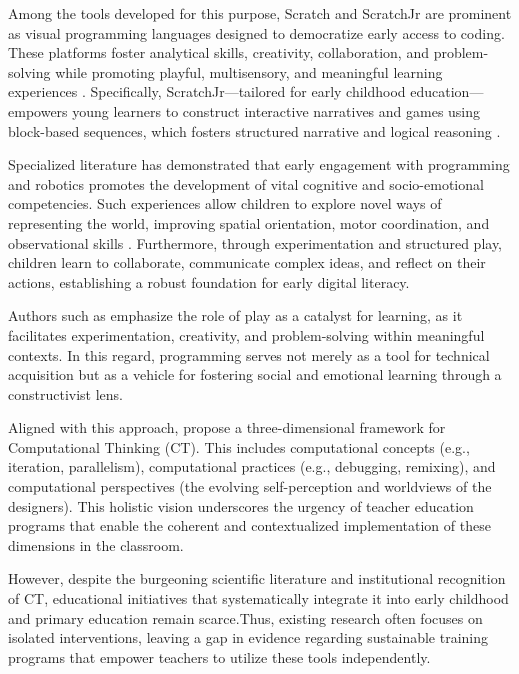 \documentclass[english]{textolivre}
\begin{document}
Among the tools developed for this purpose, Scratch and ScratchJr are prominent as visual programming languages designed to democratize early access to coding. These platforms foster analytical skills, creativity, collaboration, and problem-solving while promoting playful, multisensory, and meaningful learning experiences \cite{resnick2013designing}. Specifically, ScratchJr—tailored for early childhood education—empowers young learners to construct interactive narratives and games using block-based sequences, which fosters structured narrative and logical reasoning \cite{bers2018scratchjr}.

Specialized literature has demonstrated that early engagement with programming and robotics promotes the development of vital cognitive and socio-emotional competencies. Such experiences allow children to explore novel ways of representing the world, improving spatial orientation, motor coordination, and observational skills \cite{bers2017coding}. Furthermore, through experimentation and structured play, children learn to collaborate, communicate complex ideas, and reflect on their actions, establishing a robust foundation for early digital literacy.

Authors such as \textcite{resnick2013designing,bers2014computational} emphasize the role of play as a catalyst for learning, as it facilitates experimentation, creativity, and problem-solving within meaningful contexts. In this regard, programming serves not merely as a tool for technical acquisition but as a vehicle for fostering social and emotional learning through a constructivist lens.

Aligned with this approach, \textcite{brennan2012new} propose a three-dimensional framework for Computational Thinking (CT). This includes computational concepts (e.g., iteration, parallelism), computational practices (e.g., debugging, remixing), and computational perspectives (the evolving self-perception and worldviews of the designers). This holistic vision underscores the urgency of teacher education programs that enable the coherent and contextualized implementation of these dimensions in the classroom.

However, despite the burgeoning scientific literature and institutional recognition of CT, educational initiatives that systematically integrate it into early childhood and primary education remain scarce.Thus, existing research often focuses on isolated interventions, leaving a gap in evidence regarding sustainable training programs that empower teachers to utilize these tools independently.
\end{document}
